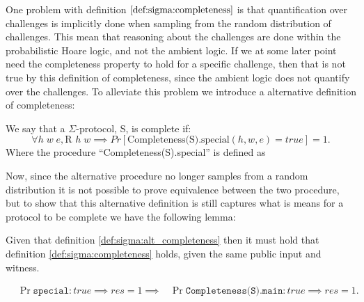One problem with definition $\ref{def:sigma:completeness}$ is that
quantification over challenges is implicitly done when sampling from the random
distribution of challenges. This mean that reasoning about the challenges are
done within the probabilistic Hoare logic, and not the ambient logic. If we at
some later point need the completeness property to hold for a specific
challenge, then that is not true by this definition of completeness, since
the ambient logic does not quantify over the challenges. To alleviate this
problem we introduce a alternative definition of completeness:

\begin{definition}
\label{def:sigma:alt_completeness}
  We say that a $\Sigma$-protocol, S, is complete if:
  \begin{equation}
    \label{eq:sigma_completeness}
    \forall h \; w \; e, \text{R } h \; w \implies Pr[\text{Completeness(S).special}(h,w,e) = true] = 1.
  \end{equation}
  Where the procedure ``Completeness(S).special'' is defined as
  
\end{definition}

Now, since the alternative procedure no longer samples from a random
distribution it is not possible to prove equivalence between the two procedure,
but to show that this alternative definition is still captures what is means for
a protocol to be complete we have the following lemma:

\begin{lemma}
Given that definition \ref{def:sigma:alt_completeness} then it must hold that
definition \ref{def:sigma:completeness} holds, given the same public input and witness.

\begin{align*}
  &\Pr{\texttt{special} : true \implies res} = 1 \implies
    &\Pr{\texttt{Completeness(S).main} : true \implies res} = 1.
\end{align*}
\end{lemma}

